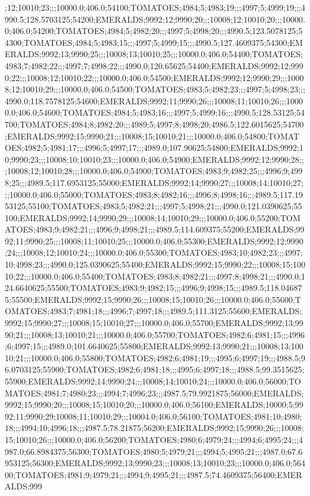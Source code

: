 ;12;10010;23;;;10000.0;406.0;54100;TOMATOES;4984;5;4983;19;;;4997;5;4999;19;;;4990.5;128.5703125;54200;EMERALDS;9992;12;9990;20;;;10008;12;10010;20;;;10000.0;406.0;54200;TOMATOES;4984;5;4982;20;;;4997;5;4998;20;;;4990.5;123.5078125;54300;TOMATOES;4984;5;4983;15;;;4997;5;4999;15;;;4990.5;127.4609375;54300;EMERALDS;9992;13;9990;25;;;10008;13;10010;25;;;10000.0;406.0;54400;TOMATOES;4983;7;4982;22;;;4997;7;4998;22;;;4990.0;120.65625;54400;EMERALDS;9992;12;9990;22;;;10008;12;10010;22;;;10000.0;406.0;54500;EMERALDS;9992;12;9990;29;;;10008;12;10010;29;;;10000.0;406.0;54500;TOMATOES;4983;5;4982;23;;;4997;5;4998;23;;;4990.0;118.7578125;54600;EMERALDS;9992;11;9990;26;;;10008;11;10010;26;;;10000.0;406.0;54600;TOMATOES;4984;5;4983;16;;;4997;5;4999;16;;;4990.5;128.53125;54700;TOMATOES;4984;8;4982;20;;;4989;5;4997;8;4998;20;4986.5;122.6015625;54700;EMERALDS;9992;15;9990;21;;;10008;15;10010;21;;;10000.0;406.0;54800;TOMATOES;4982;5;4981;17;;;4996;5;4997;17;;;4989.0;107.90625;54800;EMERALDS;9992;10;9990;23;;;10008;10;10010;23;;;10000.0;406.0;54900;EMERALDS;9992;12;9990;28;;;10008;12;10010;28;;;10000.0;406.0;54900;TOMATOES;4983;9;4982;25;;;4996;9;4998;25;;;4989.5;117.6953125;55000;EMERALDS;9992;14;9990;27;;;10008;14;10010;27;;;10000.0;406.0;55000;TOMATOES;4983;8;4982;16;;;4996;8;4998;16;;;4989.5;117.1953125;55100;TOMATOES;4983;5;4982;21;;;4997;5;4998;21;;;4990.0;121.0390625;55100;EMERALDS;9992;14;9990;29;;;10008;14;10010;29;;;10000.0;406.0;55200;TOMATOES;4983;9;4982;21;;;4996;9;4998;21;;;4989.5;114.609375;55200;EMERALDS;9992;11;9990;25;;;10008;11;10010;25;;;10000.0;406.0;55300;EMERALDS;9992;12;9990;24;;;10008;12;10010;24;;;10000.0;406.0;55300;TOMATOES;4983;10;4982;23;;;4997;10;4998;23;;;4990.0;125.0390625;55400;EMERALDS;9992;15;9990;22;;;10008;15;10010;22;;;10000.0;406.0;55400;TOMATOES;4983;8;4982;21;;;4997;8;4998;21;;;4990.0;124.6640625;55500;TOMATOES;4983;9;4982;15;;;4996;9;4998;15;;;4989.5;118.046875;55500;EMERALDS;9992;15;9990;26;;;10008;15;10010;26;;;10000.0;406.0;55600;TOMATOES;4983;7;4981;18;;;4996;7;4997;18;;;4989.5;111.3125;55600;EMERALDS;9992;15;9990;27;;;10008;15;10010;27;;;10000.0;406.0;55700;EMERALDS;9992;13;9990;21;;;10008;13;10010;21;;;10000.0;406.0;55700;TOMATOES;4982;6;4981;15;;;4996;6;4997;15;;;4989.0;101.6640625;55800;EMERALDS;9992;13;9990;21;;;10008;13;10010;21;;;10000.0;406.0;55800;TOMATOES;4982;6;4981;19;;;4995;6;4997;19;;;4988.5;96.0703125;55900;TOMATOES;4982;6;4981;18;;;4995;6;4997;18;;;4988.5;99.3515625;55900;EMERALDS;9992;14;9990;24;;;10008;14;10010;24;;;10000.0;406.0;56000;TOMATOES;4981;7;4980;23;;;4994;7;4996;23;;;4987.5;79.9921875;56000;EMERALDS;9992;15;9990;20;;;10008;15;10010;20;;;10000.0;406.0;56100;EMERALDS;10000;5;9992;11;9990;29;10008;11;10010;29;;;10004.0;406.0;56100;TOMATOES;4981;10;4980;18;;;4994;10;4996;18;;;4987.5;78.21875;56200;EMERALDS;9992;15;9990;26;;;10008;15;10010;26;;;10000.0;406.0;56200;TOMATOES;4980;6;4979;24;;;4994;6;4995;24;;;4987.0;66.8984375;56300;TOMATOES;4980;5;4979;21;;;4994;5;4995;21;;;4987.0;67.6953125;56300;EMERALDS;9992;13;9990;23;;;10008;13;10010;23;;;10000.0;406.0;56400;TOMATOES;4981;9;4979;21;;;4994;9;4995;21;;;4987.5;74.4609375;56400;EMERALDS;999